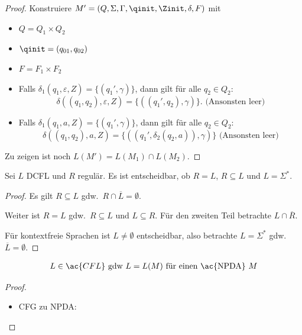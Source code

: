 {\begin{proof}
    Konstruiere $M'= (Q, \Sigma, \Gamma, \qinit, \Zinit, \delta, F)$ mit
    \begin{itemize}
    \item $Q = Q_1 \times Q_2$
    \item $\qinit = (q_{01}, q_{02})$
    \item $F = F_1  \times F_2$
    \item Falls $\delta_1 (q_1, \varepsilon, Z) = \{(q_1', \gamma)\}$, dann gilt für alle $q_2\in Q_2$: 
      \[ \delta ((q_1, q_2), \varepsilon, Z)
      = \{((q_1', q_2), \gamma)\} \text{.     (Ansonsten leer)} \]
    \item Falls $\delta_1 (q_1, a, Z) = \{(q_1', \gamma)\}$, dann gilt für alle $q_2\in Q_2$: 
      \[ \delta ((q_1, q_2), a, Z) =
      \{((q_1', \delta_2 (q_2, a)), \gamma)\} \text{   (Ansonsten leer)} \]
    \end{itemize}
    Zu zeigen ist noch $L (M') = L (M_1) \cap L (M_2)$.
\end{proof}
\begin{Satz}
    Sei $L$ DCFL und $R$ regulär.
    Es ist entscheidbar, ob $R=L$, $R\subseteq L$ und $L=\Sigma^*$.
\end{Satz}
\begin{proof}
    Es gilt $R\subseteq L$ gdw.\ $R \cap \overline{L} = \emptyset$.
    
    Weiter ist $R = L$ gdw.\ $R\subseteq L$ und $L \subseteq R$. Für den zweiten Teil betrachte $L\cap \overline{R}$.
    
    Für kontextfreie Sprachen ist $L\ne \emptyset$ entscheidbar, also betrachte $L=\Sigma^*$ gdw.\ $\overline{L}=\emptyset$.
\end{proof}















\begin{Satz}\label{satz:5.1}
  \begin{align*}
                L \in \ac{CFL}  \text{ gdw } L =L(M) \text{ für einen \ac{NPDA} $M$}
  \end{align*}
\end{Satz}
\begin{proof}\hfill
        \begin{itemize}
        \item \ac{CFG} zu \ac{NPDA}:



\end{itemize}
\end{proof}}
